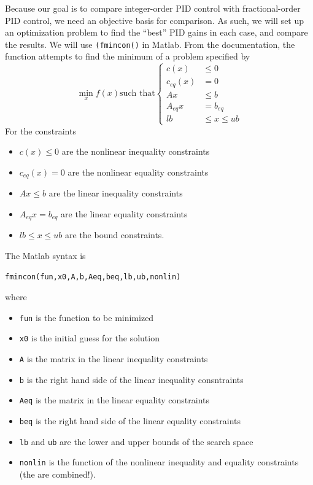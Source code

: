 Because our goal is to compare integer-order PID control with fractional-order PID control, we need an objective basis for comparison. As such, we will set up an optimization problem to find the ``best'' PID gains in each case, and compare the results. We will use \texttt{(fmincon()} in Matlab. From the documentation, the function attempts to find the minimum of a problem specified by
\begin{equation}
  \min_x f(x) \mbox{such that} \begin{cases} c(x) &\leq 0 \\ 
    c_{eq}(x) &= 0 \\ 
					A x &\leq b \\ 
					A_{eq} x &= b_{eq} \\ 
					lb &\leq x \leq ub  \end{cases}
  \label{eq:opt}
\end{equation}
For the constraints
\begin{itemize}
  \item $c(x) \leq 0$ are the nonlinear inequality constraints
  \item $c_{eq}(x) = 0$ are the nonlinear equality constraints
  \item $Ax \leq b$ are the linear inequality constraints
  \item $A_{eq} x = b_{eq}$ are the linear equality constraints
  \item $lb \leq x \leq ub$ are the bound constraints.
\end{itemize}
The Matlab syntax is
\begin{center}
  \texttt{fmincon(fun,x0,A,b,Aeq,beq,lb,ub,nonlin)}
\end{center}
where 
\begin{itemize}
  \item \texttt{fun} is the function to be minimized
  \item \texttt{x0} is the initial guess for the solution
  \item \texttt{A} is the matrix in the linear inequality constraints
  \item \texttt{b} is the right hand side of the linear inequality consntraints
  \item \texttt{Aeq} is the matrix in the linear equality constraints
  \item \texttt{beq} is the right hand side of the linear equality constraints
  \item \texttt{lb} and \texttt{ub} are the lower and upper bounds of the search space
  \item \texttt{nonlin} is the function of the nonlinear inequality and equality constraints (the are combined!).
\end{itemize}

